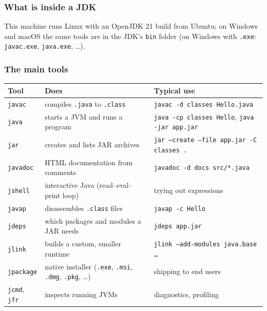 \documentclass[aspectratio=169,10pt,compress]{beamer}
\begin{document}
\begin{frame}[t,fragile] \frametitle{What is inside a JDK}

  \vspace{0.1em}
  \small
  This machine runs Linux with an OpenJDK 21 build from Ubuntu; on Windows and macOS the same tools are in the JDK's
  \texttt{bin} folder (on Windows with \texttt{.exe}: \texttt{javac.exe}, \texttt{java.exe}, \dots).
\end{frame}




\begin{frame}[t,fragile] \frametitle{The main tools}
  \footnotesize
  \begin{tabular}{@{}L{0.13\textwidth}L{0.37\textwidth}L{0.44\textwidth}@{}}
    \toprule
    \textbf{Tool} & \textbf{Does} & \textbf{Typical use} \\
    \midrule
    \texttt{javac}     & compiles \texttt{.java} to \texttt{.class}       & \texttt{javac -d classes Hello.java} \\
    \texttt{java}      & starts a JVM and runs a program             & \texttt{java -cp classes Hello}, \texttt{java -jar app.jar} \\
    \texttt{jar}       & creates and lists JAR archives              & \texttt{jar --create --file app.jar -C classes .} \\
    \texttt{javadoc}   & HTML documentation from comments            & \texttt{javadoc -d docs src/*.java} \\
    \texttt{jshell}    & interactive Java (read--eval--print loop)  & trying out expressions \\
    \texttt{javap}     & disassembles \texttt{.class} files          & \texttt{javap -c Hello} \\
    \texttt{jdeps}     & which packages and modules a JAR needs      & \texttt{jdeps app.jar} \\
    \texttt{jlink}     & builds a custom, smaller runtime            & \texttt{jlink --add-modules java.base \dots} \\
    \texttt{jpackage}  & native installer (\texttt{.exe}, \texttt{.msi}, \texttt{.dmg}, \texttt{.pkg}, \dots) & shipping to end users \\
    \texttt{jcmd}, \texttt{jfr} & inspects running JVMs              & diagnostics, profiling \\
    \bottomrule
  \end{tabular}
\end{frame}
\end{document}
